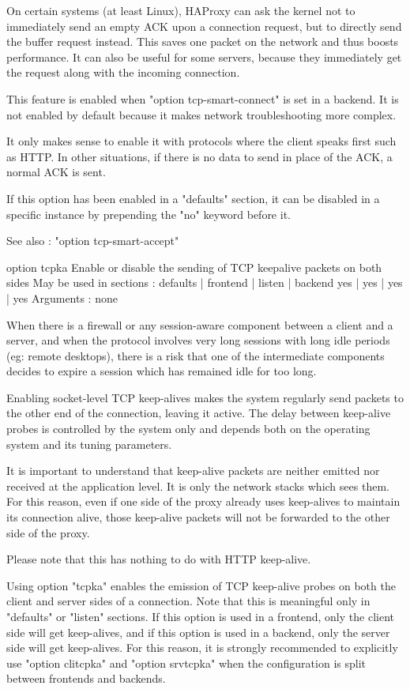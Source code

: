   On certain systems (at least Linux), HAProxy can ask the kernel not to
  immediately send an empty ACK upon a connection request, but to directly
  send the buffer request instead. This saves one packet on the network and
  thus boosts performance. It can also be useful for some servers, because they
  immediately get the request along with the incoming connection.

  This feature is enabled when "option tcp-smart-connect" is set in a backend.
  It is not enabled by default because it makes network troubleshooting more
  complex.

  It only makes sense to enable it with protocols where the client speaks first
  such as HTTP. In other situations, if there is no data to send in place of
  the ACK, a normal ACK is sent.

  If this option has been enabled in a "defaults" section, it can be disabled
  in a specific instance by prepending the "no" keyword before it.

  See also : "option tcp-smart-accept"


option tcpka
  Enable or disable the sending of TCP keepalive packets on both sides
  May be used in sections :   defaults | frontend | listen | backend
                                 yes   |    yes   |   yes  |   yes
  Arguments : none

  When there is a firewall or any session-aware component between a client and
  a server, and when the protocol involves very long sessions with long idle
  periods (eg: remote desktops), there is a risk that one of the intermediate
  components decides to expire a session which has remained idle for too long.

  Enabling socket-level TCP keep-alives makes the system regularly send packets
  to the other end of the connection, leaving it active. The delay between
  keep-alive probes is controlled by the system only and depends both on the
  operating system and its tuning parameters.

  It is important to understand that keep-alive packets are neither emitted nor
  received at the application level. It is only the network stacks which sees
  them. For this reason, even if one side of the proxy already uses keep-alives
  to maintain its connection alive, those keep-alive packets will not be
  forwarded to the other side of the proxy.

  Please note that this has nothing to do with HTTP keep-alive.

  Using option "tcpka" enables the emission of TCP keep-alive probes on both
  the client and server sides of a connection. Note that this is meaningful
  only in "defaults" or "listen" sections. If this option is used in a
  frontend, only the client side will get keep-alives, and if this option is
  used in a backend, only the server side will get keep-alives. For this
  reason, it is strongly recommended to explicitly use "option clitcpka" and
  "option srvtcpka" when the configuration is split between frontends and
  backends.

